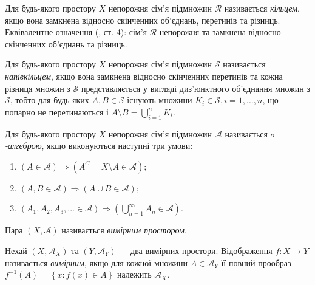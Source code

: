 \begin{definition}
    Для будь-якого простору $X$
    непорожня сім'я підмножин $\mathcal{R}$ 
    називається \emph{кільцем}, якщо
    вона замкнена відносно скінченних об'єднань, перетинів
    та різниць. Еквівалентне означення (\cite{Berezanskij}, ст. 4):
    сім'я $\mathcal{R}$ непорожня та
    замкнена відносно скінченних об'єднань та різниць.
\end{definition}
\begin{definition}
    Для будь-якого простору $X$
    непорожня сім'я підмножин $\mathcal{S}$ 
    називається \emph{напівкільцем}, якщо
    вона замкнена відносно скінченних перетинів та кожна різниця
    множин з $\mathcal{S}$ представляється
    у вигляді диз'юнктного об'єднання множин з $\mathcal{S}$, тобто
    для будь-яких $A, B \in \mathcal{S}$ існують
    множини $K_i \in \mathcal{S}, i = 1,\dots,n$,
    що попарно не перетинаються і $A \setminus B = \bigcup_{i=1}^n K_i$.
\end{definition}
\begin{definition}
    Для будь-якого простору $X$
    непорожня сім'я підмножин $\mathcal{A}$ 
    називається \emph{$\sigma$-алгеброю},
    якщо виконуються наступні три умови:
    \begin{enumerate}
        \item $\left(A \in \mathcal{A}\right) \Rightarrow \left(A^C = X \setminus A \in \mathcal{A}\right)$;
        \item $\left(A, B \in \mathcal{A}\right) \Rightarrow \left(A \cup B\in \mathcal{A}\right)$; 
        \item $\left(A_1, A_2, A_3, ... \in \mathcal{A}\right) \Rightarrow \left(\bigcup_{n=1}^{\infty} A_n \in \mathcal{A}\right)$.
    \end{enumerate} 
    Пара $\left(X, \mathcal{A}\right)$ називається \emph{вимірним простором}.
\end{definition}
\begin{definition}
    Нехай $\left(X, \mathcal{A}_X\right)$ та $\left(Y, \mathcal{A}_Y\right)$ ---
    два вимірних простори. Відображення $f: X \to Y$ називається 
    \emph{вимірним}, якщо для кожної множини
    $A \in \mathcal{A}_Y$ її повний прообраз
    $f^{-1}(A) = \left\{x : f(x) \in A\right\}$
    належить $\mathcal{A}_X$.
\end{definition}
